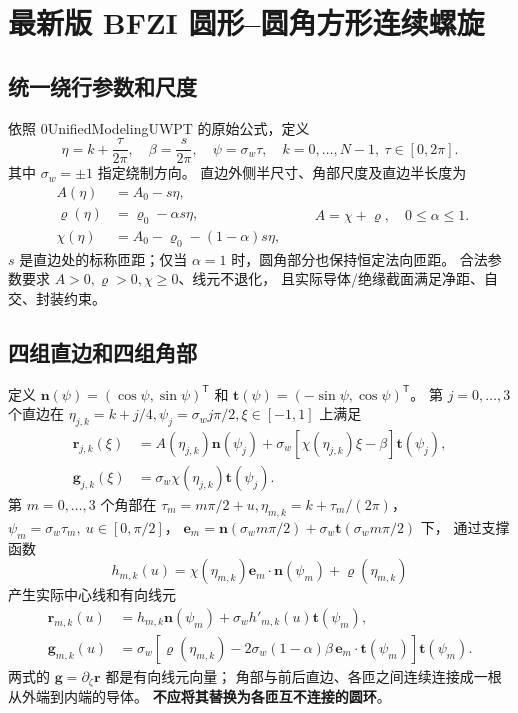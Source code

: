 \section{最新版 BFZI 圆形--圆角方形连续螺旋}\label{sec:geometry}
\subsection{统一绕行参数和尺度}
依照 0UnifiedModelingUWPT 的原始公式，定义
\begin{equation}
\eta=k+\frac{\tau}{2\pi},\quad
\beta=\frac{s}{2\pi},\quad
\psi=\sigma_w\tau,\quad
k=0,\ldots,N-1,\ \tau\in[0,2\pi].
\end{equation}
其中 \(\sigma_w=\pm1\) 指定绕制方向。
直边外侧半尺寸、角部尺度及直边半长度为
\begin{equation}
\boxed{\begin{aligned}
A(\eta)&=A_0-s\eta,\\
\varrho(\eta)&=\varrho_0-\alpha s\eta,\\
\chi(\eta)&=A_0-\varrho_0-(1-\alpha)s\eta,
\end{aligned}}\qquad
A=\chi+\varrho,\quad 0\le\alpha\le1.
\label{eq:bfzi-scales}
\end{equation}
\(s\) 是直边处的标称匝距；仅当 \(\alpha=1\) 时，圆角部分也保持恒定法向匝距。
合法参数要求 \(A>0,\varrho>0,\chi\ge0\)、线元不退化，
且实际导体/绝缘截面满足净距、自交、封装约束。

\subsection{四组直边和四组角部}
定义 \(\bm n(\psi)=(\cos\psi,\sin\psi)^{\mathsf T}\) 和
\(\bm t(\psi)=(-\sin\psi,\cos\psi)^{\mathsf T}\)。
第 \(j=0,\dots,3\) 个直边在
\(\eta_{j,k}=k+j/4,\psi_j=\sigma_wj\pi/2,\xi\in[-1,1]\) 上满足
\begin{equation}
\begin{aligned}
\bm r_{j,k}(\xi)&=A(\eta_{j,k})\bm n(\psi_j)
 +\sigma_w[\chi(\eta_{j,k})\xi-\beta]\bm t(\psi_j),\\
\bm g_{j,k}(\xi)&=\sigma_w\chi(\eta_{j,k})\bm t(\psi_j).
\end{aligned}
\label{eq:bfzi-straight}
\end{equation}
第 \(m=0,\dots,3\) 个角部在
\(\tau_m=m\pi/2+u,\eta_{m,k}=k+\tau_m/(2\pi)\)，
\(\psi_m=\sigma_w\tau_m,\ u\in[0,\pi/2]\)，
\(\bm e_m=\bm n(\sigma_wm\pi/2)+\sigma_w\bm t(\sigma_wm\pi/2)\) 下，
通过支撑函数
\[
h_{m,k}(u)=\chi(\eta_{m,k})\bm e_m\cdot\bm n(\psi_m)
+\varrho(\eta_{m,k})
\]
产生实际中心线和有向线元
\begin{equation}
\begin{aligned}
\bm r_{m,k}(u)&=h_{m,k}\bm n(\psi_m)
 +\sigma_wh'_{m,k}(u)\bm t(\psi_m),\\
\bm g_{m,k}(u)&=\sigma_w[
 \varrho(\eta_{m,k})
 -2\sigma_w(1-\alpha)\beta\,\bm e_m\cdot\bm t(\psi_m)]
 \bm t(\psi_m).
\end{aligned}
\label{eq:bfzi-corner}
\end{equation}
两式的 \(\bm g=\partial_{\zeta}\bm r\) 都是有向线元向量；
角部与前后直边、各匝之间连续连接成一根从外端到内端的导体。
\textbf{不应将其替换为各匝互不连接的圆环}。

